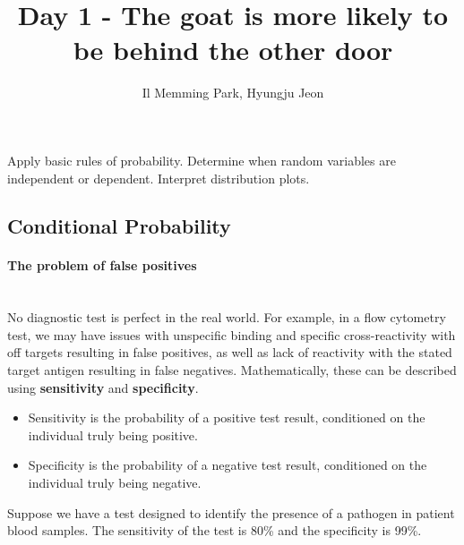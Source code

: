 \documentclass[a4paper,11pt]{exam}
\title{Day 1 - The goat is more likely to be behind the other door}
\author{Il Memming Park, Hyungju Jeon}
\newcounter{ct}
\newcommand{\myparagraph}[1]{\paragraph{#1}\mbox{}\\}
\begin{document}
\maketitle
\begin{tcolorbox}[colback=black!1!,title=Learning Objective 1]
   Apply basic rules of probability. Determine when random variables are independent or dependent. Interpret distribution plots.
\end{tcolorbox}

\subsection{Conditional Probability}

\myparagraph{The problem of false positives} No diagnostic test is perfect in the real world. 
For example, in a flow cytometry test, we may have issues with unspecific binding and specific cross-reactivity with off targets resulting in false positives, as well as lack of reactivity with the stated target antigen resulting in false negatives. Mathematically, these can be described using \textbf{sensitivity} and \textbf{specificity}. 
\begin{itemize}
    \item Sensitivity is the probability of a positive test result, conditioned on the individual truly being positive.
    \item Specificity is the probability of a negative test result, conditioned on the individual truly being negative.
\end{itemize}

Suppose we have a test designed to identify the presence of a pathogen in patient blood samples. The sensitivity of the test is 80\% and the specificity is 99\%.  
\end{document}
